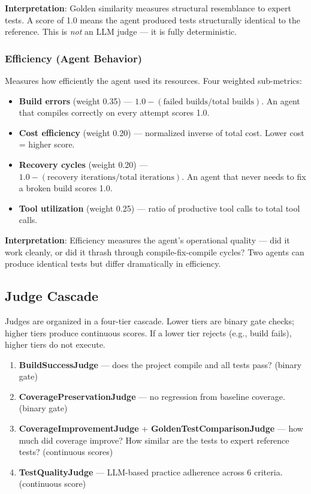 \documentclass[11pt,a4paper]{article}
\begin{document}
\textbf{Interpretation}: Golden similarity measures structural resemblance to
expert tests. A score of 1.0 means the agent produced tests structurally identical
to the reference. This is \emph{not} an LLM judge --- it is fully deterministic.

\subsubsection{Efficiency (Agent Behavior)}

Measures how efficiently the agent used its resources. Four weighted sub-metrics:

\begin{itemize}
  \item \textbf{Build errors} (weight 0.35) --- $1.0 - (\text{failed builds} / \text{total builds})$. An agent that compiles correctly on every attempt scores 1.0.
  \item \textbf{Cost efficiency} (weight 0.20) --- normalized inverse of total cost. Lower cost = higher score.
  \item \textbf{Recovery cycles} (weight 0.20) --- $1.0 - (\text{recovery iterations} / \text{total iterations})$. An agent that never needs to fix a broken build scores 1.0.
  \item \textbf{Tool utilization} (weight 0.25) --- ratio of productive tool calls to total tool calls.
\end{itemize}

\textbf{Interpretation}: Efficiency measures the agent's operational quality ---
did it work cleanly, or did it thrash through compile-fix-compile cycles?
Two agents can produce identical tests but differ dramatically in efficiency.

\subsection{Judge Cascade}

Judges are organized in a four-tier cascade. Lower tiers are binary gate checks;
higher tiers produce continuous scores. If a lower tier rejects (e.g., build fails),
higher tiers do not execute.

\begin{enumerate}[label=\textbf{Tier \arabic*:}, leftmargin=3cm]
  \item[Tier 0:] \textbf{BuildSuccessJudge} --- does the project compile and all tests pass? (binary gate)
  \item[Tier 1:] \textbf{CoveragePreservationJudge} --- no regression from baseline coverage. (binary gate)
  \item[Tier 2:] \textbf{CoverageImprovementJudge} + \textbf{GoldenTestComparisonJudge} --- how much did coverage improve? How similar are the tests to expert reference tests? (continuous scores)
  \item[Tier 3:] \textbf{TestQualityJudge} --- LLM-based practice adherence across 6 criteria. (continuous score)
\end{enumerate}
\end{document}
